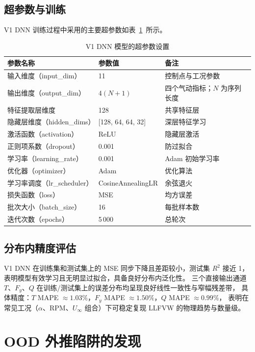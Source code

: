 \subsection{超参数与训练}

V1 DNN 训练过程中采用的主要超参数如表~\ref{tab:dnn_hyper}~所示。

\begin{table}[htbp]
\centering
\caption{V1 DNN 模型的超参数设置}
\label{tab:dnn_hyper}
\begin{tabular}{lll}
\toprule
\textbf{参数名称} & \textbf{参数值} & \textbf{备注} \\
\midrule
输入维度（input\_dim） & 11 & 控制点与工况参数 \\
输出维度（output\_dim） & $4(N+1)$ & 四个气动指标；$N$ 为序列长度 \\
特征提取层维度 & 128 & 共享特征层 \\
隐藏层维度（hidden\_dims） & [128, 64, 64, 32] & 深层特征学习 \\
激活函数（activation） & ReLU & 隐藏层激活 \\
正则项系数（dropout） & 0.001 & 防过拟合 \\
学习率（learning\_rate） & 0.001 & Adam 初始学习率 \\
优化器（optimizer） & Adam & 优化算法 \\
学习率调度（lr\_scheduler） & CosineAnnealingLR & 余弦退火 \\
损失函数（loss） & MSE & 均方误差 \\
批次大小（batch\_size） & 16 & 每批样本数 \\
迭代次数（epochs） & 5\,000 & 总轮次 \\
\bottomrule
\end{tabular}
\end{table}

\subsection{分布内精度评估}

V1 DNN 在训练集和测试集上的 MSE 同步下降且差距较小，测试集 $R^2$ 接近 1，
表明模型有效学习且无明显过拟合，具备良好分布内泛化性。
三个直接输出通道 $T$、$F_y$、$Q$ 在训练/测试集上的误差分布均呈现良好线性一致性与窄幅残差带，
具体精度：$T$ MAPE $\approx 1.03\%$，$F_y$ MAPE $\approx 1.50\%$，$Q$ MAPE $\approx 0.99\%$，
表明在常见工况（$\alpha$、$\text{RPM}$、$U_\infty$ 组合）下可稳定复现 LLFVW 的物理趋势与数量级。

\section{OOD 外推陷阱的发现}

